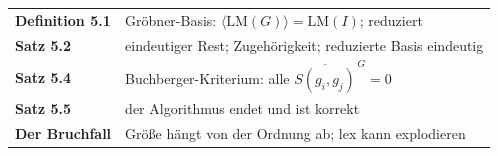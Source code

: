 \begin{merksatz}
\begin{center}
\renewcommand{\arraystretch}{1.5}
\begin{tabular}{@{}P{3.0cm}P{5.6cm}@{}}
\toprule
\textbf{Definition 5.1} & Gröbner-Basis: $\langle\mathrm{LM}(G)\rangle = \mathrm{LM}(I)$; reduziert\\
\textbf{Satz 5.2} & eindeutiger Rest; Zugehörigkeit; reduzierte Basis eindeutig\\
\textbf{Satz 5.4} & Buchberger-Kriterium: alle $\overline{S(g_i, g_j)}^{\,G} = 0$\\
\textbf{Satz 5.5} & der Algorithmus endet und ist korrekt\\
\textbf{Der Bruchfall} & Größe hängt von der Ordnung ab; lex kann explodieren\\
\bottomrule
\end{tabular}
\end{center}

\begin{center}
\begin{minipage}{0.88\textwidth}
\end{minipage}
\end{center}
\end{merksatz}
